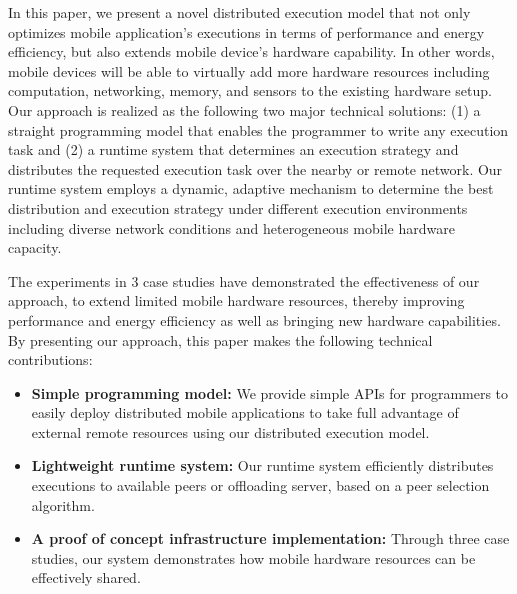 \documentclass{sig-alternate}[10pt]
\begin{document}
In this paper, we present a novel distributed execution model that not only optimizes mobile application's executions in terms of performance and energy efficiency, but also extends mobile device's hardware capability. In other words, mobile devices will be able to virtually add more hardware resources including computation, networking, memory, and sensors to the existing hardware setup. Our approach is realized as the following two major technical solutions: (1) a straight programming model that enables the programmer to write any execution task and (2) a runtime system that determines an execution strategy and distributes the requested execution task over the nearby or remote network. Our runtime system employs a dynamic, adaptive mechanism to determine the best distribution and execution strategy under different execution environments including diverse network conditions and heterogeneous mobile hardware capacity.

The experiments in 3 case studies have demonstrated the effectiveness of our approach, to extend limited mobile hardware resources, thereby improving performance and energy efficiency as well as bringing new hardware capabilities. By presenting our approach, this paper makes the following technical contributions:
\begin{itemize}
	\item \textbf{Simple programming model:} We provide simple APIs for programmers to easily deploy distributed mobile applications to take full advantage of external remote resources using our distributed execution model.
	\item \textbf{Lightweight runtime system:} Our runtime system efficiently distributes executions to available peers or offloading server, based on a peer selection algorithm. 	
	\item \textbf{A proof of concept infrastructure implementation:} Through three case studies, our system demonstrates how mobile hardware resources can be effectively shared.
\end{itemize}

\end{document}
